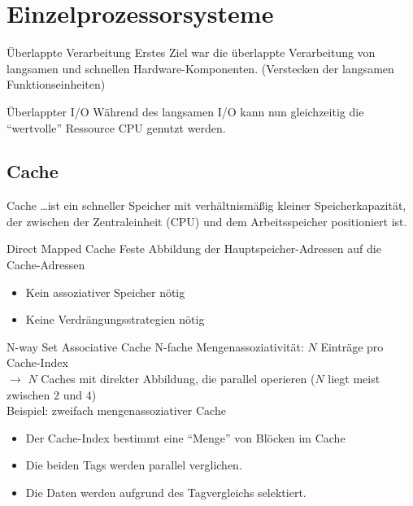 \section{Einzelprozessorsysteme}\label{sec:einzelprozessorsysteme}

\begin{defi}{Überlappte Verarbeitung}
    Erstes Ziel war die überlappte Verarbeitung von langsamen und schnellen Hardware-Komponenten. 
    (Verstecken der langsamen Funktionseinheiten)
\end{defi}

\begin{defi}{Überlappter I/O}
    Während des langsamen I/O kann nun gleichzeitig die \enquote{wertvolle} Ressource CPU genutzt werden.
\end{defi}

\subsection{Cache}\label{subsec:cache}

\begin{defi}{Cache}
    \ldots ist ein schneller Speicher mit verhältnismäßig kleiner Speicherkapazität, 
    der zwischen der Zentraleinheit (CPU) und dem Arbeitsspeicher positioniert ist.
\end{defi}

\begin{defi}{Direct Mapped Cache}
    Feste Abbildung der Hauptspeicher-Adressen auf die Cache-Adressen
    \begin{itemize}[$\to$]
        \item Kein assoziativer Speicher nötig
        \item Keine Verdrängungsstrategien nötig
    \end{itemize}
\end{defi}

\begin{defi}{N-way Set Associative Cache}
    N-fache Mengenassoziativität: $N$ Einträge pro Cache-Index \\
    \quad $\to$ $N$ Caches mit direkter Abbildung, die parallel operieren
    ($N$ liegt meist zwischen 2 und 4)\\
    Beispiel: zweifach mengenassoziativer Cache
    \begin{itemize}
        \item Der Cache-Index bestimmt eine \enquote{Menge} von Blöcken im Cache
        \item Die beiden Tags werden parallel verglichen.
        \item Die Daten werden aufgrund des Tagvergleichs selektiert.
    \end{itemize}
\end{defi}

